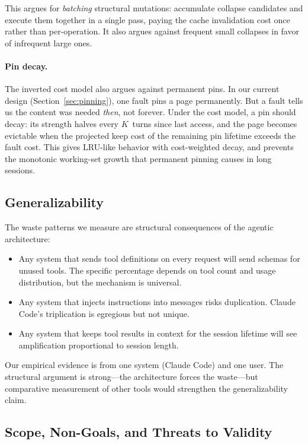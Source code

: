 This argues for \emph{batching} structural mutations: accumulate
collapse candidates and execute them together in a single pass,
paying the cache invalidation cost once rather than per-operation.
It also argues against frequent small collapses in favor of
infrequent large ones.

\paragraph{Pin decay.}
The inverted cost model also argues against permanent pins. In our
current design (Section~\ref{sec:pinning}), one fault pins a page
permanently. But a fault tells us the content was needed \emph{then},
not forever. Under the cost model, a pin should decay: its strength
halves every $K$~turns since last access, and the page becomes
evictable when the projected keep cost of the remaining pin lifetime
exceeds the fault cost. This gives LRU-like behavior with
cost-weighted decay, and prevents the monotonic working-set growth
that permanent pinning causes in long sessions.

\subsection{Generalizability}

The waste patterns we measure are structural consequences of the
agentic architecture:

\begin{itemize}[nosep]
  \item Any system that sends tool definitions on every request
    will send schemas for unused tools. The specific percentage
    depends on tool count and usage distribution, but the mechanism
    is universal.
  \item Any system that injects instructions into messages risks
    duplication. Claude Code's triplication is egregious but not
    unique.
  \item Any system that keeps tool results in context for the
    session lifetime will see amplification proportional to session
    length.
\end{itemize}

Our empirical evidence is from one system (Claude Code) and one
user. The structural argument is strong---the architecture
forces the waste---but comparative measurement of other tools
would strengthen the generalizability claim.

\subsection{Scope, Non-Goals, and Threats to Validity}

